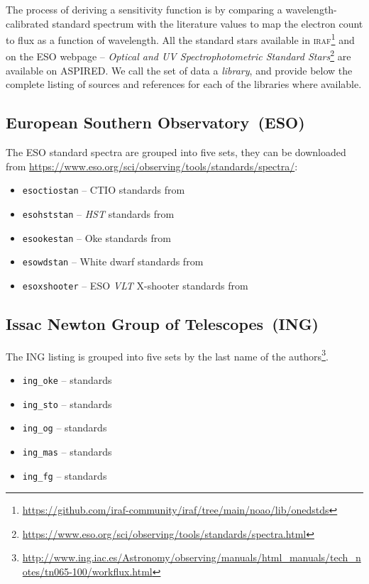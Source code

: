 \documentclass[linenumbers, twocolumn]{aastex631}
\begin{document}
The process of deriving a sensitivity function is by comparing a
wavelength-calibrated standard spectrum with the literature values to map the electron count to flux as a function of wavelength. All
the standard stars available in
\textsc{iraf}\footnote{\url{https://github.com/iraf-community/iraf/tree/main/noao/lib/onedstds}}
and on the ESO webpage -- \textit{Optical and UV Spectrophotometric Standard 
Stars}\footnote{\url{https://www.eso.org/sci/observing/tools/standards/spectra.html}}
are available on \textsc{ASPIRED}. We call the set of data a
\textit{library}, and provide below the complete listing of sources and references
for each of the libraries where available.

\subsection*{European Southern Observatory~(ESO)}
The ESO standard spectra are grouped into five sets, they can be downloaded from \url{https://www.eso.org/sci/observing/tools/standards/spectra/}:

\begin{itemize}
    \item \texttt{esoctiostan} -- CTIO standards from \citet{1992PASP..104..533H, 1994PASP..106..566H}
    \item \texttt{esohststan} -- \textit{HST} standards from \citet{1995AJ....110.1316B, 1996AJ....111.1743B}
    \item \texttt{esookestan} -- Oke standards from \citet{1990AJ.....99.1621O}
    \item \texttt{esowdstan} -- White dwarf standards from \citet{1995AJ....110.1316B}
    \item \texttt{esoxshooter} -- ESO \textit{VLT} X-shooter standards from \citet{2014Msngr.158...16M, 2014A&A...568A...9M}
\end{itemize}


\subsection*{Issac Newton Group of Telescopes~(ING)}

The ING listing is grouped into five sets by the last name of the authors\footnote{\url{http://www.ing.iac.es/Astronomy/observing/manuals/html_manuals/tech_notes/tn065-100/workflux.html}}.

\begin{itemize}
    \item \texttt{ing\_oke} -- \citet{1990AJ.....99.1621O} standards
    \item \texttt{ing\_sto} -- \citet{1977ApJ...218..767S} standards
    \item \texttt{ing\_og} -- \citet{1983ApJ...266..713O} standards
    \item \texttt{ing\_mas} -- \citet{1988ApJ...328..315M} standards
    \item \texttt{ing\_fg} -- \citet{1984PASP...96..530F} standards
\end{itemize}
\end{document}
